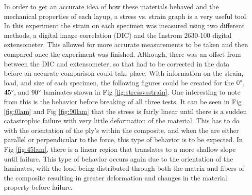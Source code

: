 
In order to get an accurate idea of how these materials behaved and the mechanical properties of each layup, a stress vs. strain graph is a very useful tool. In this experiment the strain on each specimen was measured using two different methods, a digital image correlation (DIC) and the Instrom 2630-100 digital extensometer. This allowed for more accurate measurements to be taken and then compared once the experiment was finished. Although, there was an offset from between the DIC and extensometer, so that had to be corrected in the data before an accurate comparison could take place. With information on the strain, load, and size of each specimen, the following figures could be created for the $0\degree$, $45\degree$, and $90\degree$ laminates shown in Fig \ref{fig:stressvsstrain}.  One interesting to note from this is the behavior before breaking of all three tests. It can be seen in Fig \ref{fig:0lam} and Fig \ref{fig:90lam} that the stress is fairly linear until there is a sudden catastrophic failure with very little deformation of the material. This has to do with the orientation of the ply's within the composite, and when the are either parallel or perpendicular to the force, this type of behavior is to be expected. In Fig \ref{fig:45lam}, there is a linear region that translates to a more shallow slope until failure. This type of behavior occurs again due to the orientation of the laminates, with the load being distributed through both the matrix and fibers of the composite resulting in greater deformation and changes in the material property before failure. 


